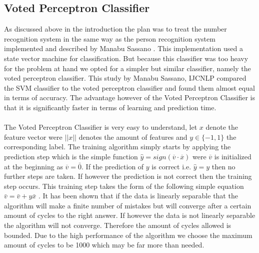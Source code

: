 \documentclass[%
        compressed,
        final,
        notitlepage,
        narroweqnarray,
        inline,
        twoside,
        ]{ieee}
\begin{document}
\subsection{Voted Perceptron Classifier}
As discussed above in the introduction the plan was to treat the number
recognition system in the same way as the person recognition system implemented
and described by Manabu Sassano \cite{Manabu}.
This implementation used a state vector machine for classification. But because
this classifier was too heavy for the problem at hand we opted for a simpler but
similar classifier, namely the voted perceptron classifier. This study by Manabu
Sassano, IJCNLP compared the SVM classifier to the voted perceptron classifier
and found them almost equal in terms of accuracy. The advantage however of the
Voted Perceptron Classifier is that it is significantly faster in terms of learning
and prediction time.\\\\
The Voted Perceptron Classifier is very easy to understand, let $x$ denote the
feature vector were $||x||$ denotes the amount of features and $y \in \{-1,1\}$
the corresponding label. The training algorithm simply starts by applying the
prediction step which is the simple function $\hat{y} =
sign(\overline{v}\cdot\overline{x})$ were $\overline{v}$ is
initialized at the beginning as $\overline{v}=\bar{0}$. If the prediction of $y$ is correct i.e.
$\hat{y}=y$
then no further steps are taken. If however the prediction is not correct then
the training step occurs. This training step takes the form of the following
simple equation $\bar{v}=\bar{v}+y\bar{x}$ . It has been shown that if the data is linearly separable that
the algorithm will make a finite number of mistakes but will converge after a
certain amount of cycles to the right answer. If however the data is not
linearly separable the algorithm will not converge. Therefore the amount of
cycles allowed is bounded. Due to the high performance of the algorithm we
choose the maximum amount of cycles to be 1000 which may be far more than
needed.
\end{document}
